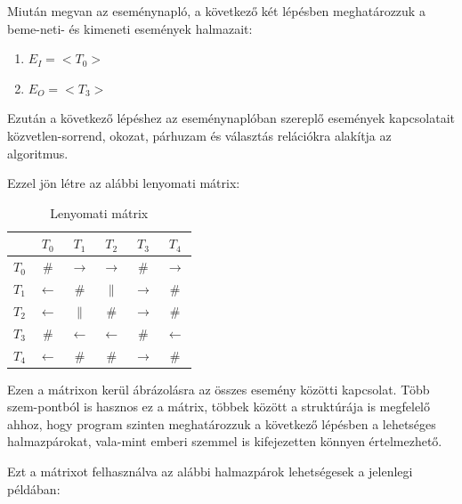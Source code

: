 \begin{example}
	Miután megvan az eseménynapló, a következő két lépésben meghatározzuk a beme\hyp{}neti- és kimeneti események halmazait:
	\begin{enumerate}
		\item $E_I=<T_0>$
		\item $E_O=<T_3>$		
	\end{enumerate}

	Ezután a következő lépéshez az eseménynaplóban szereplő események kapcsolatait közvetlen-sorrend, okozat, párhuzam és választás relációkra alakítja az algoritmus.

	Ezzel jön létre az alábbi lenyomati mátrix:
	
	\begin{table}[h]
	\begin{center}
	\caption{Lenyomati mátrix}
	\begin{tabular}{|c | c | c | c | c | c|}
		\hline
		\hspace{0.1cm} & $T_0$ & $T_1$ & $T_2$ & $T_3$ & $T_4$ \\
		\hline
		$T_0$ & \# & $\rightarrow$ & $\rightarrow$ & \# & $\rightarrow$ \\
		\hline
		$T_1$ & $\leftarrow$ & \# & $\parallel$ & $\rightarrow$ & \# \\
		\hline
		$T_2$ & $\leftarrow$ & $\parallel$ & \# & $\rightarrow$ & \# \\
		\hline
		$T_3$ & \# & $\leftarrow$ & $\leftarrow$ & \# & $\leftarrow$ \\
		\hline
		$T_4$ & $\leftarrow$ & \# & \# & $\rightarrow$ & \# \\
		\hline
	\end{tabular}
	\label{fig:planexample}
	\end{center}
	\end{table}

	Ezen a mátrixon kerül ábrázolásra az összes esemény közötti kapcsolat. Több szem\hyp{}pontból is hasznos ez a mátrix, többek között a struktúrája is megfelelő ahhoz, hogy program szinten meghatározzuk a következő lépésben a lehetséges halmazpárokat, vala\hyp{}mint emberi szemmel is kifejezetten könnyen értelmezhető.

	Ezt a mátrixot felhasználva az alábbi halmazpárok lehetségesek a jelenlegi példában:
	\newpage


\end{example}
